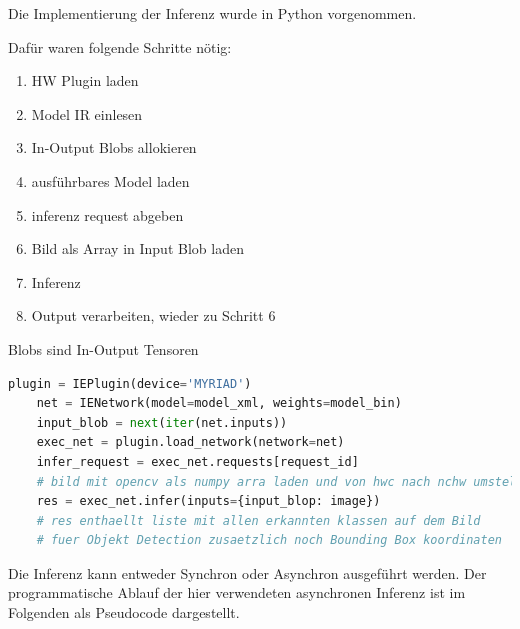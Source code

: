 Die Implementierung der Inferenz wurde in Python vorgenommen. 

Dafür waren folgende Schritte nötig:

 
\begin{enumerate}
    \item HW Plugin laden
    \item Model IR einlesen
    \item In-Output Blobs allokieren 
    \item ausführbares Model laden
    \item inferenz request abgeben
    \item Bild als Array in Input Blob laden
    \item Inferenz
    \item Output verarbeiten, wieder zu Schritt 6
\end{enumerate}


\begin{figure}[htb]
    \centering
        
    \label{fig:diagramm}
\end{figure}


Blobs sind In-Output Tensoren


\begin{lstlisting}[language=Python]
    plugin = IEPlugin(device='MYRIAD')
    net = IENetwork(model=model_xml, weights=model_bin)
    input_blob = next(iter(net.inputs))
    exec_net = plugin.load_network(network=net)
    infer_request = exec_net.requests[request_id]
    # bild mit opencv als numpy arra laden und von hwc nach nchw umstellen
    res = exec_net.infer(inputs={input_blop: image})
    # res enthaellt liste mit allen erkannten klassen auf dem Bild
    # fuer Objekt Detection zusaetzlich noch Bounding Box koordinaten
\end{lstlisting}


Die Inferenz kann entweder Synchron oder Asynchron ausgeführt 
werden. Der programmatische Ablauf der hier verwendeten 
asynchronen Inferenz ist im Folgenden als Pseudocode dargestellt.



